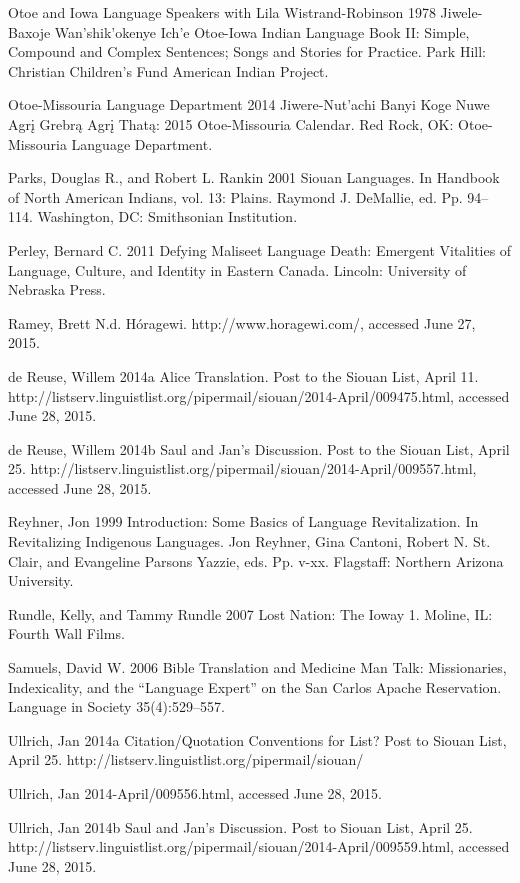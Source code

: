 \documentclass[output=paper]{LSP/langsci}
\begin{document}
\begin{reflist}
Otoe and Iowa Language Speakers with Lila Wistrand-Robinson 1978 Jiwele-Baxoje Wan'shik'okenye Ich'e Otoe-Iowa Indian Language Book II: Simple, Compound and Complex Sentences; Songs and Stories for Practice. Park Hill: Christian Children's Fund American Indian Project.

Otoe-Missouria Language Department 2014 Jiwere-Nut'achi Banyi Koge Nuwe Agr\k{i} Grebr\k{a} Agr\k{i} That\k{a}: 2015 Otoe-Missouria Calendar. Red Rock, OK: Otoe-Missouria Language Department.

Parks, Douglas R., and Robert L. Rankin 2001 Siouan Languages. In Handbook of North American Indians, vol. 13: Plains. Raymond J. DeMallie, ed. Pp. 94--114. Washington, DC: Smithsonian Institution.

Perley, Bernard C. 2011 Defying Maliseet Language Death: Emergent Vitalities of Language, Culture, and Identity in Eastern Canada. Lincoln: University of Nebraska Press.

Ramey, Brett N.d. H\'oragewi. http://www.horagewi.com/, accessed June 27, 2015.

de Reuse, Willem 2014a Alice Translation. Post to the Siouan List, April 11. http://listserv.linguistlist.org/pipermail/siouan/2014-April/009475.html, accessed June 28, 2015.

de Reuse, Willem 2014b Saul and Jan's Discussion. Post to the Siouan List, April 25. http://listserv.linguistlist.org/pipermail/siouan/2014-April/009557.html, accessed June 28, 2015.

Reyhner, Jon 1999 Introduction: Some Basics of Language Revitalization. In Revitalizing Indigenous Languages. Jon Reyhner, Gina Cantoni, Robert N. St. Clair, and Evangeline Parsons Yazzie, eds. Pp. v-xx. Flagstaff: Northern Arizona University.

Rundle, Kelly, and Tammy Rundle 2007 Lost Nation: The Ioway 1. Moline, IL: Fourth Wall Films.

Samuels, David W. 2006 Bible Translation and Medicine Man Talk: Missionaries, Indexicality, and the ``Language Expert'' on the San Carlos Apache Reservation. Language in Society 35(4):529--557.

Ullrich, Jan 2014a Citation/Quotation Conventions for List? Post to Siouan List, April 25. http://listserv.linguistlist.org/pipermail/siouan/

Ullrich, Jan 2014-April/009556.html, accessed June 28, 2015.

Ullrich, Jan 2014b Saul and Jan's Discussion. Post to Siouan List, April 25. http://listserv.linguistlist.org/pipermail/siouan/2014-April/009559.html, accessed June 28, 2015.


\end{reflist}
\end{document}
